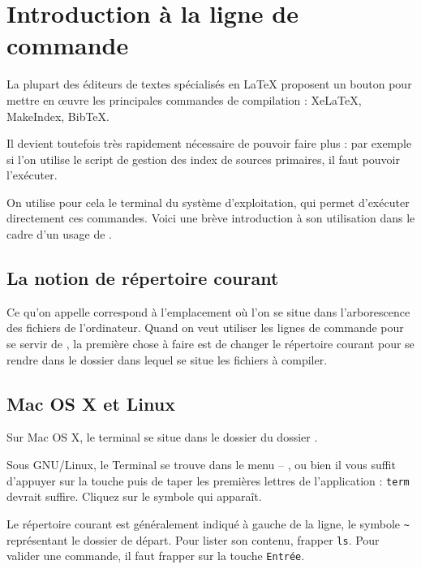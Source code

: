 \chapter{Introduction à la ligne de commande}\label{terminal}

\begin{intro}
La plupart des éditeurs de textes spécialisés en LaTeX  proposent un bouton pour mettre en œuvre les principales commandes de compilation :  XeLaTeX, MakeIndex, BibTeX.

Il devient toutefois très rapidement nécessaire de pouvoir faire plus : par exemple si l’on utilise le script de gestion des index de sources primaires, il faut pouvoir l'exécuter.

On utilise pour cela le terminal du système d'exploitation, qui permet d'exécuter directement ces commandes. Voici une brève introduction à son utilisation dans le cadre d'un usage de \XeLaTeX.
\end{intro}

\section{La notion de répertoire courant}\label{repcourant}

Ce qu'on appelle  correspond à l'emplacement où l'on se situe dans l'arborescence des fichiers de l'ordinateur. Quand on veut utiliser les lignes de commande pour se servir de \XeLaTeX, la première chose à faire est de changer le répertoire courant pour se rendre dans le dossier dans lequel se situe les fichiers à compiler.

\section{Mac OS X et Linux}

Sur Mac OS X, le terminal se situe dans le dossier  du dossier . 

Sous GNU/Linux, le Terminal se trouve dans le menu  – 
, ou bien il vous suffit d'appuyer sur la touche  puis de taper les premières lettres de l'application : \verb|term| devrait suffire. Cliquez sur le symbole qui apparaît.

Le répertoire courant est généralement indiqué à gauche de la ligne, le symbole  \verb|~|  représentant le dossier de départ. Pour lister son contenu, frapper \verb|ls|. Pour valider une commande, il faut frapper sur la touche \verb|Entrée|.

